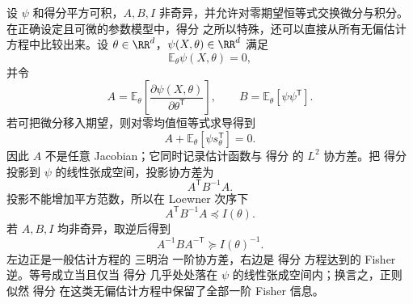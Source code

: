 \begin{proposition}
设 $\psi$ 和得分平方可积，$A,B,I$ 非奇异，并允许对零期望恒等式交换微分与积分。
在正确设定且可微的参数模型中，得分 之所以特殊，还可以直接从所有无偏估计方程中比较出来。设 $\theta\in\RR^d$，$\psi(X,\theta)\in\RR^d$ 满足
\[
 \mathbb E_\theta\psi(X,\theta)=0,
\]
并令
\[
 A=\mathbb E_\theta\!\left[
 \frac{\partial\psi(X,\theta)}
 {\partial\theta^{\mathsf T}}
 \right],
 \qquad
 B=\mathbb E_\theta[\psi\psi^{\mathsf T}].
\]
若可把微分移入期望，则对零均值恒等式求导得到
\begin{equation}\label{eq:math-stat-estimating-score-covariance}
 A+\mathbb E_\theta[\psi s_\theta^{\mathsf T}]=0.
\end{equation}
因此 $A$ 不是任意 Jacobian；它同时记录估计函数与 得分 的 $L^2$ 协方差。把 得分 投影到 $\psi$ 的线性张成空间，投影协方差为
\[
 A^{\mathsf T}B^{-1}A.
\]
投影不能增加平方范数，所以在 Loewner 次序下
\begin{equation}\label{eq:math-stat-godambe-information-bound}
 A^{\mathsf T}B^{-1}A\preceq I(\theta).
\end{equation}
若 $A,B,I$ 均非奇异，取逆后得到
\begin{equation*}A^{-1}BA^{-\mathsf T}\succeq I(\theta)^{-1}.
\end{equation*}
左边正是一般估计方程的 三明治 一阶协方差，右边是 得分 方程达到的 Fisher 逆。等号成立当且仅当 得分 几乎处处落在 $\psi$ 的线性张成空间内；换言之，正则 似然 得分 在这类无偏估计方程中保留了全部一阶 Fisher 信息。
\end{proposition}

